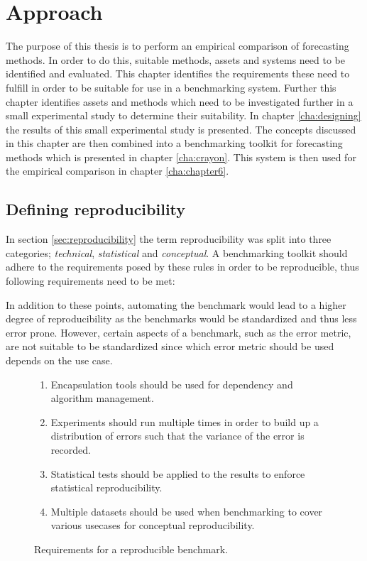 \chapter{Approach}
\label{cha:approach}

The purpose of this thesis is to perform an empirical comparison of forecasting methods. In order to do this, suitable methods, assets and systems need to be identified and evaluated.
This chapter identifies the requirements these need to fulfill in order to be suitable for use in a benchmarking system. Further this chapter identifies assets and methods which need to be investigated further in a small experimental study to determine their suitability. In chapter \ref{cha:designing} the results of this small experimental study is presented. The concepts discussed in this chapter are then combined into a benchmarking toolkit for forecasting methods which is presented in chapter \ref{cha:crayon}. This system is then used for the empirical comparison in chapter \ref{cha:chapter6}.

\section{Defining reproducibility}
In section \ref{sec:reproducibility} the term reproducibility was split into three categories; \textit{technical}, \textit{statistical} and \textit{conceptual}. A benchmarking toolkit should adhere to the requirements posed by these rules in order to be reproducible, thus following requirements need to be met:

In addition to these points, automating the benchmark would lead to a higher degree of reproducibility as the benchmarks would be standardized and thus less error prone. However, certain aspects of a benchmark, such as the error metric, are not suitable to be standardized since which error metric should be used depends on the use case.

\begin{figure}[h]
  \begin{enumerate}
    \item Encapsulation tools should be used for dependency and algorithm management.
    \item Experiments should run multiple times in order to build up a distribution of errors such that the variance of the error is recorded.
    \item Statistical tests should be applied to the results to enforce statistical reproducibility.
    \item Multiple datasets should be used when benchmarking to cover various usecases for conceptual reproducibility.
  \end{enumerate}
  \caption{Requirements for a reproducible benchmark.}
  \label{fig:reproducibility_requirements}
\end{figure}

